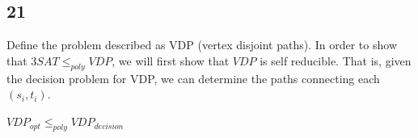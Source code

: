 \documentclass[letterpaper,notitlepage,twoside]{article}
\begin{document}
\subsection*{21}
Define the problem described as VDP (vertex disjoint paths). In order to show that $3SAT \leq _{poly} VDP$, we will first show that $VDP$ is self reducible. That is, given the decision problem for VDP, we can determine the paths connecting each $(s_i, t_i)$. \\\\
$VDP_{opt} \leq _{poly} VDP_{decision}$\\
\end{document}
